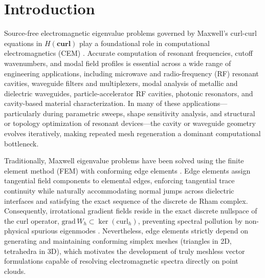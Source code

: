 \documentclass[VANCOUVER]{USG}
\begin{document}

\section{Introduction}
\label{sec:introduction}

Source-free electromagnetic eigenvalue problems governed by Maxwell's curl-curl equations in $H(\mathbf{curl})$ play a foundational role in computational electromagnetics (CEM) \cite{monk2003finite, jin2014finite, boffi2006finite}. Accurate computation of resonant frequencies, cutoff wavenumbers, and modal field profiles is essential across a wide range of engineering applications, including microwave and radio-frequency (RF) resonant cavities, waveguide filters and multiplexers, modal analysis of metallic and dielectric waveguides, particle-accelerator RF cavities, photonic resonators, and cavity-based material characterization. In many of these applications---particularly during parametric sweeps, shape sensitivity analysis, and structural or topology optimization of resonant devices---the cavity or waveguide geometry evolves iteratively, making repeated mesh regeneration a dominant computational bottleneck.

Traditionally, Maxwell eigenvalue problems have been solved using the finite element method (FEM) with conforming edge elements \cite{nedelec1980mixed, monk2003finite, jin2014finite}. Edge elements assign tangential field components to elemental edges, enforcing tangential trace continuity while naturally accommodating normal jumps across dielectric interfaces and satisfying the exact sequence of the discrete de Rham complex. Consequently, irrotational gradient fields reside in the exact discrete nullspace of the curl operator, $\mathrm{grad} \, W_h \subset \ker(\mathrm{curl}_h)$, preventing spectral pollution by non-physical spurious eigenmodes \cite{bossavit1998computational, boffi2006finite, boffi2013mixed}. Nevertheless, edge elements strictly depend on generating and maintaining conforming simplex meshes (triangles in 2D, tetrahedra in 3D), which motivates the development of truly meshless vector formulations capable of resolving electromagnetic spectra directly on point clouds.
\end{document}
